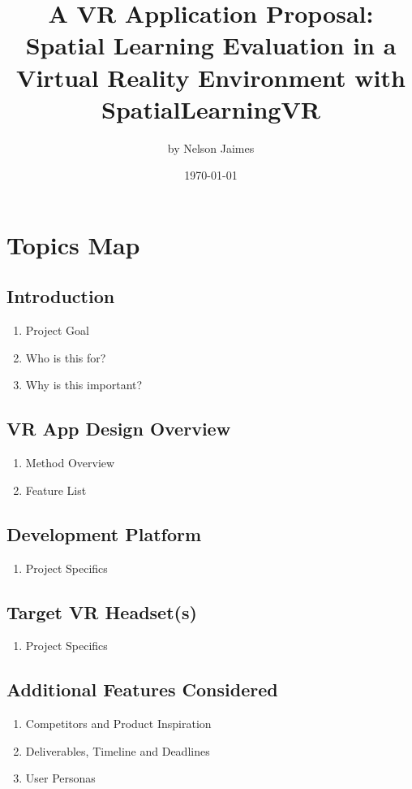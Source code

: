 \documentclass{report}
\title{A VR Application Proposal: Spatial Learning Evaluation in a Virtual Reality Environment with SpatialLearningVR}
\author{by Nelson Jaimes}
\date{\today}
\begin{document}
\maketitle

\chapter*{Topics Map}
\section*{Introduction}
\begin{enumerate}[{1.}1]
  \item Project Goal
  \item Who is this for?
  \item Why is this important?
\end{enumerate}
\section*{VR App Design Overview}
\begin{enumerate}[{2.}1]
  \item Method Overview
  \item Feature List
\end{enumerate}
\section*{Development Platform}
\begin{enumerate}[{3.}1]
  \item Project Specifics
\end{enumerate}
\section*{Target VR Headset(s)}
\begin{enumerate}[{4.}1]
  \item Project Specifics
\end{enumerate}
\section*{Additional Features Considered}
\begin{enumerate}[{5.}1]
  \item Competitors and Product Inspiration
  \item Deliverables, Timeline and Deadlines
  \item User Personas
\end{enumerate}
\end{document}
